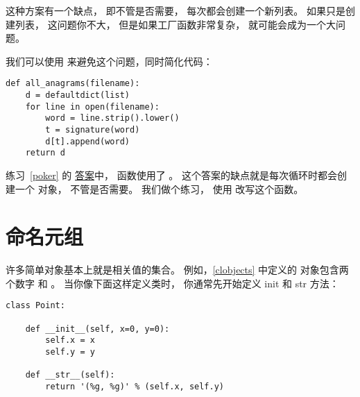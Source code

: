 这种方案有一个缺点， 即不管是否需要， 每次都会创建一个新列表。
如果只是创建列表， 这问题你不大， 但是如果工厂函数非常复杂， 就可能会成为一个大问题。


我们可以使用  来避免这个问题，同时简化代码：

\begin{lstlisting}
def all_anagrams(filename):
    d = defaultdict(list)
    for line in open(filename):
        word = line.strip().lower()
        t = signature(word)
        d[t].append(word)
    return d
\end{lstlisting}


练习~\ref{poker} 的 \href{http://thinkpython2.com/code/PokerHandSoln.py}{答案}中，  函数使用了 。
这个答案的缺点就是每次循环时都会创建一个  对象， 不管是否需要。
我们做个练习， 使用  改写这个函数。


\section{命名元组}


许多简单对象基本上就是相关值的集合。
例如，\ref{clobjects} 中定义的  对象包含两个数字  和  。
当你像下面这样定义类时， 你通常先开始定义 init 和 str 方法：

\begin{lstlisting}
class Point:

    def __init__(self, x=0, y=0):
        self.x = x
        self.y = y

    def __str__(self):
        return '(%g, %g)' % (self.x, self.y)
\end{lstlisting}

